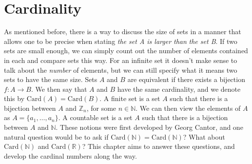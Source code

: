 \section{Cardinality}
    As mentioned before, there is a way to discuss the size of sets in a manner
    that allows one to be precise when stating \textit{the set A is larger than}
    \textit{the set B}. If two sets are small enough, we can simply count out
    the number of elements contained in each and compare sets this way. For an
    infinite set it doesn't make sense to talk about the \textit{number} of
    elements, but we can still specify what it means two sets to have the same
    size. Sets $A$ and $B$ are equivalent if there exists a bijection
    $f:A\rightarrow{B}$. We then say that $A$ and $B$ have the same cardinality,
    and we denote this by $\textrm{Card}(A)=\textrm{Card}(B)$. A finite set is a
    set $A$ such that there is a bijection between $A$ and $\mathbb{Z}_{n}$, for
    some $n\in\mathbb{N}$. We can then view the elements of $A$ as
    $A=\{a_{1},\hdots,a_{n}\}$. A countable set is a set $A$ such that there is
    a bijection between $A$ and $\mathbb{N}$. These notions were first developed
    by Georg Cantor, and one natural question would be to
    ask if $\textrm{Card}(\mathbb{N})=\textrm{Card}(\mathbb{N})$? What about
    $\textrm{Card}(\mathbb{N})$ and $\textrm{Card}(\mathbb{R})$? This chapter
    aims to answer these questions, and develop the cardinal numbers along the
    way.
